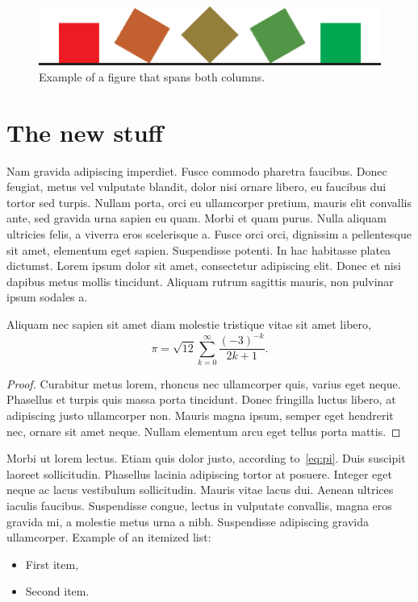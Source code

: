 \documentclass[submission]{gmp2015}
\begin{document}
\begin{figure}\centering
\includegraphics{example}
\caption{Example of a figure that spans both columns.}
\end{figure}


\section{The new stuff}

Nam gravida adipiscing imperdiet. Fusce commodo pharetra faucibus. Donec feugiat, metus vel vulputate blandit, dolor nisi ornare libero, eu faucibus dui tortor sed turpis. Nullam porta, orci eu ullamcorper pretium, mauris elit convallis ante, sed gravida urna sapien eu quam. Morbi et quam purus. Nulla aliquam ultricies felis, a viverra eros scelerisque a. Fusce orci orci, dignissim a pellentesque sit amet, elementum eget sapien. Suspendisse potenti. In hac habitasse platea dictumst. Lorem ipsum dolor sit amet, consectetur adipiscing elit. Donec et nisi dapibus metus mollis tincidunt. Aliquam rutrum sagittis mauris, non pulvinar ipsum sodales a.

\begin{theorem}\label{theorem:pi}
Aliquam nec sapien sit amet diam molestie tristique vitae sit amet libero,
\begin{equation}\label{eq:pi}
\pi = \sqrt{12}\sum^\infty_{k=0} \frac{(-3)^{-k}}{2k+1}.
\end{equation}
\end{theorem}

\begin{proof}
Curabitur metus lorem, rhoncus nec ullamcorper quis, varius eget neque. Phasellus et turpis quis massa porta tincidunt. Donec fringilla luctus libero, at adipiscing justo ullamcorper non. Mauris magna ipsum, semper eget hendrerit nec, ornare sit amet neque. Nullam elementum arcu eget tellus porta mattis.
\end{proof}

\noindent
Morbi ut lorem lectus. Etiam quis dolor justo, according to~\eqref{eq:pi}. Duis suscipit laoreet sollicitudin. Phasellus lacinia adipiscing tortor at posuere. Integer eget neque ac lacus vestibulum sollicitudin. Mauris vitae lacus dui. Aenean ultrices iaculis faucibus. Suspendisse congue, lectus in vulputate convallis, magna eros gravida mi, a molestie metus urna a nibh. Suspendisse adipiscing gravida ullamcorper.
%
Example of an itemized list:
\begin{itemize}
  \item First item,
  \item Second item.
\end{itemize}
\end{document}

